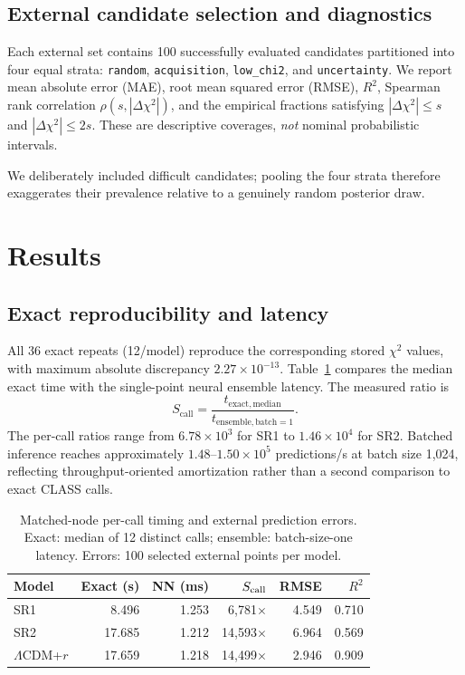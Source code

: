 \documentclass[a4paper,conference,10pt]{IEEEtran}
\begin{document}
\subsection{External candidate selection and diagnostics}
Each external set contains 100 successfully evaluated candidates partitioned into four equal strata: \texttt{random}, \texttt{acquisition}, \texttt{low\_chi2}, and \texttt{uncertainty}. We report mean absolute error (MAE), root mean squared error (RMSE), $R^2$, Spearman rank correlation $\rho(s,|\Delta\chi^2|)$, and the empirical fractions satisfying $|\Delta\chi^2|\leq s$ and $|\Delta\chi^2|\leq2s$. These are descriptive coverages, \emph{not} nominal probabilistic intervals.

We deliberately included difficult candidates; pooling the four strata therefore exaggerates their prevalence relative to a genuinely random posterior draw.

\section{Results}
\subsection{Exact reproducibility and latency}
All 36 exact repeats (12/model) reproduce the corresponding stored $\chi^2$ values, with maximum absolute discrepancy $2.27\times10^{-13}$. Table~\ref{tab:perf} compares the median exact time with the single-point neural ensemble latency. The measured ratio is
\begin{equation}
S_{\mathrm{call}}=\frac{t_{\mathrm{exact,median}}}{t_{\mathrm{ensemble,batch=1}}}.\label{eq:speedup}
\end{equation}
The per-call ratios range from $6.78\times10^{3}$ for SR1 to $1.46\times10^{4}$ for SR2. Batched inference reaches approximately $1.48$--$1.50\times10^{5}$ predictions/s at batch size 1,024, reflecting throughput-oriented amortization rather than a second comparison to exact CLASS calls.

\begin{table}[t]
\caption{Matched-node per-call timing and external prediction errors. Exact: median of 12 distinct calls; ensemble: batch-size-one latency. Errors: 100 selected external points per model.}
\label{tab:perf}
\centering
\footnotesize
\setlength{\tabcolsep}{3.1pt}
\begin{tabular}{@{}lrrrrr@{}}
\toprule
Model & Exact (s) & NN (ms) & $S_{\rm call}$ & RMSE & $R^2$\\
\midrule
SR1 & 8.496 & 1.253 & 6,781$\times$ & 4.549 & 0.710 \\
SR2 & 17.685 & 1.212 & 14,593$\times$ & 6.964 & 0.569 \\
$\Lambda$CDM+$r$ & 17.659 & 1.218 & 14,499$\times$ & 2.946 & 0.909 \\
\bottomrule
\end{tabular}
\end{table}
\end{document}
